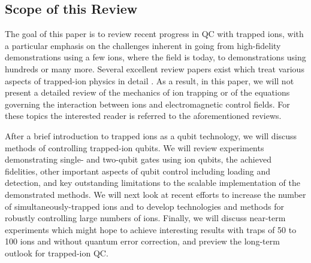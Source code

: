 \documentclass[%
reprint,
 amsmath,amssymb,
]{revtex4-1}
\begin{document}

\subsection{Scope of this Review}

The goal of this paper is to review recent progress in QC with trapped ions, with a particular emphasis on the challenges inherent in going from high-fidelity demonstrations using a few ions, where the field is today, to demonstrations using hundreds or many more. Several excellent review papers exist which treat various aspects of trapped-ion physics in detail \cite{Wineland1998, leibfried2003quantum, Blatt:Wine:Nat08, HaffnerIonReview2008, WinelandIonReview2009, ozeri_tutorial_2011, SchindlerIonReview2013}. As a result, in this paper, we will not present a detailed review of the mechanics of ion trapping or of the equations governing the interaction between ions and electromagnetic control fields. For these topics the interested reader is referred to the aforementioned reviews.

After a brief introduction to trapped ions as a qubit technology, we will discuss methods of controlling trapped-ion qubits. We will review experiments demonstrating single- and two-qubit gates using ion qubits, the achieved fidelities, other important aspects of qubit control including loading and detection, and key outstanding limitations to the scalable implementation of the demonstrated methods. We will next look at recent efforts to increase the number of simultaneously-trapped ions and to develop technologies and methods for robustly controlling large numbers of ions. Finally, we will discuss near-term experiments which might hope to achieve interesting results with traps of 50 to 100 ions and without quantum error correction, and preview the long-term outlook for trapped-ion QC.
\end{document}
